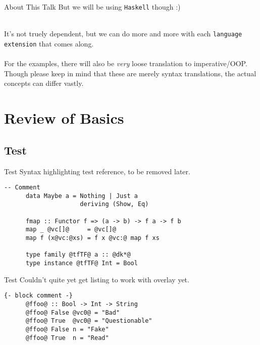 \documentclass[xcolor={usenames,dvipsnames}]{beamer}
\begin{document}
\begin{frame}{About This Talk}
  But we will be using \texttt{Haskell} though :)

  \ \\
  \pause
  It's not truely dependent, but we can do more and more with each \texttt{language extension} that comes along.\\

  \ \\
  \pause
  For the examples, there will also be \textit{very} loose translation to imperative/OOP. Though please keep in mind that these are merely syntax translations, the actual concepts can differ vastly.
\end{frame}


\section{Review of Basics}

\subsection{Test}
\begin{frame}[fragile]{Test}
  Syntax highlighting test reference, to be removed later.

  \begin{lstlisting}[style=hask]
      -- Comment
      data Maybe a = Nothing | Just a
                     deriving (Show, Eq)
 
      fmap :: Functor f => (a -> b) -> f a -> f b
      map _ @vc[]@     = @vc[]@
      map f (x@vc:@xs) = f x @vc:@ map f xs
 
      type family @tfTF@ a :: @dk*@
      type instance @tfTF@ Int = Bool
  \end{lstlisting}
\end{frame}

\begin{frame}[fragile]{Test}
  Couldn't quite yet get listing to work with overlay yet.

  \begin{lstlisting}[style=hask]
      {- block comment -}
      @ffoo@ :: Bool -> Int -> String
      @ffoo@ False @vc0@ = "Bad"
      @ffoo@ True  @vc0@ = "Questionable"
      @ffoo@ False n = "Fake"
      @ffoo@ True  n = "Read"
  \end{lstlisting}
\end{frame}
\end{document}
